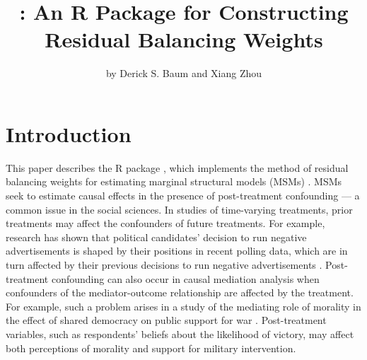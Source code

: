 \title{: An R Package for Constructing Residual Balancing
Weights}
\author{by Derick S. Baum and Xiang Zhou}

\maketitle


\hypertarget{intro}{%
\section{Introduction}\label{intro}}

This paper describes the R package , which implements the
method of residual balancing weights for estimating marginal structural
models (MSMs) \citep{zhouResidualBalancingMethod2020a}. MSMs seek to
estimate causal effects in the presence of post-treatment confounding
--- a common issue in the social sciences. In studies of time-varying
treatments, prior treatments may affect the confounders of future
treatments. For example, research has shown that political candidates'
decision to run negative advertisements is shaped by their positions in
recent polling data, which are in turn affected by their previous
decisions to run negative advertisements
\citep{lauEffectsNegativePolitical2007, blackwellFrameworkDynamicCausal2013}.
Post-treatment confounding can also occur in causal mediation analysis
when confounders of the mediator-outcome relationship are affected by
the treatment. For example, such a problem arises in a study of the
mediating role of morality in the effect of shared democracy on public
support for war \citep{tomzPublicOpinionDemocratic2013a}. Post-treatment
variables, such as respondents' beliefs about the likelihood of victory,
may affect both perceptions of morality and support for military
intervention.


